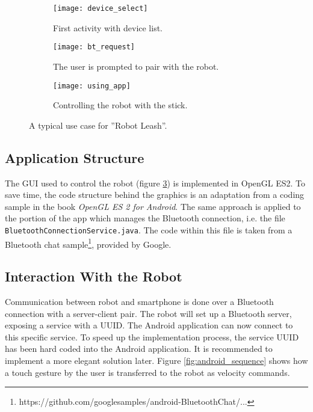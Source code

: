 \begin{figure}[H]
	\centering
	\begin{subfigure}[b]{0.30\textwidth}
		\texttt{[image: device\_select]}
		\caption{First activity with device list.}
		\label{fig:device_select}
	\end{subfigure}
		\begin{subfigure}[b]{0.30\textwidth}
			\texttt{[image: bt\_request]}
			\caption{The user is prompted to pair with the robot.}
			\label{fig:bt_request}
		\end{subfigure}
	\begin{subfigure}[b]{0.30\textwidth}
		\texttt{[image: using\_app]}
		\caption{Controlling the robot with the stick.}
		\label{fig:using_app}
	\end{subfigure}
	\caption{\label{fig:app_screens}A typical use case for ''Robot Leash''.}
\end{figure}

\subsection{Application Structure}


The \ac{GUI} used to control the robot (figure \ref{fig:using_app}) is implemented in OpenGL ES2. To save time, the code structure behind the graphics is an adaptation from a coding sample in the book \textit{OpenGL ES 2 for Android}\cite{brothaler2013opengl}. The same approach is applied to the portion of the app which manages the Bluetooth connection, i.e. the file \texttt{BluetoothConnectionService.java}. The code within this file is taken from a Bluetooth chat sample\footnote{https://github.com/googlesamples/android-BluetoothChat/...}, provided by Google. 

\subsection{Interaction With the Robot}

Communication between robot and smartphone is done over a Bluetooth connection with a server-client pair. The robot will set up a Bluetooth server, exposing a service with a \ac{UUID}. The Android application can now connect to this specific service. To speed up the implementation process, the service \ac{UUID} has been hard coded into the Android application. It is recommended to implement a more elegant solution later. Figure \ref{fig:android_sequence} shows how a touch gesture by the user is transferred to the robot as velocity commands. 

